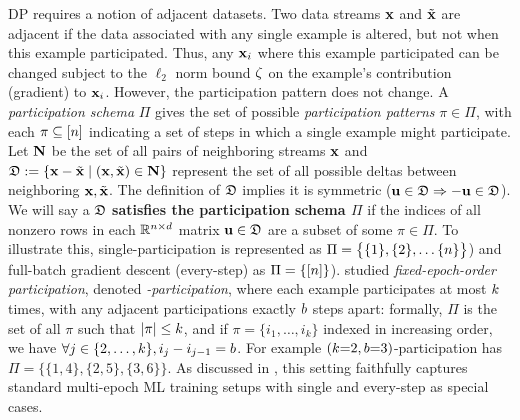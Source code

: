 \documentclass{article}
\begin{document}
DP requires a notion of adjacent datasets. Two data streams $\mathbf{x}$ and $\tilde{\mathbf{x}}$ are adjacent if the data associated with any single example is altered, but not when this example participated. Thus, any $\mathbf{x}_i$ where this example participated can be changed subject to the $\ell_2$ norm bound $\zeta$ on the example's contribution (gradient) to $\mathbf{x}_i$. However, the participation pattern does not change. A \emph{participation schema} $\Pi$ gives the set of possible \emph{participation patterns} $\pi \in \Pi$, with each $\pi \subseteq [n]$ indicating a set of steps in which a single example might participate.
%
Let $\mathbf{N}$ be the set of all pairs of neighboring streams $\mathbf{x}$ and $\mathfrak{D} := \left\{ \mathbf{x} - \tilde{\mathbf{x}} \mid (\mathbf{x}, \tilde{\mathbf{x}}) \in \mathbf{N} \right\}$ represent the set of all possible deltas between neighboring $\mathbf{x},\tilde{\mathbf{x}}$. The definition of $\mathfrak{D}$ implies it is symmetric ($\mathbf{u} \in \mathfrak{D} \Rightarrow -\mathbf{u} \in \mathfrak{D}$). We will say a $\mathfrak{D}$ \textbf{satisfies the participation schema $\Pi$} if the indices of all nonzero rows in each $\mathbb{R}^{n \times d}$ matrix $\mathbf{u} \in \mathfrak{D}$ are a subset of some $\pi \in \Pi$. 
To illustrate this, single-participation is represented as $\Pi = \big\{ \{1\}, \{2\}, \dots \{n\}\big\}$) and full-batch gradient descent (every-step) as $\Pi = \{ [n]\}$).  \citet{choquette2022multi} studied \emph{fixed-epoch-order participation}, denoted \emph{\multiepoch-participation}, where each example participates at most $k$ times, with any adjacent participations exactly $b$ steps apart: formally, $\Pi$ is the set of all $\pi$ such that $|\pi| \le k$, and if $\pi = \{i_1, \dots, i_k\}$ indexed in increasing order, we have $\forall j \in \{2, \dots, k\}, i_j - i_{j-1} = b$. For example $(k{=}2, b{=}3)$-participation has $\Pi = \{\{1, 4\}, \{2, 5\}, \{3, 6\}\}$. As discussed in \citet{choquette2022multi}, this setting faithfully captures standard multi-epoch ML training setups with single and every-step as special cases.
\end{document}

